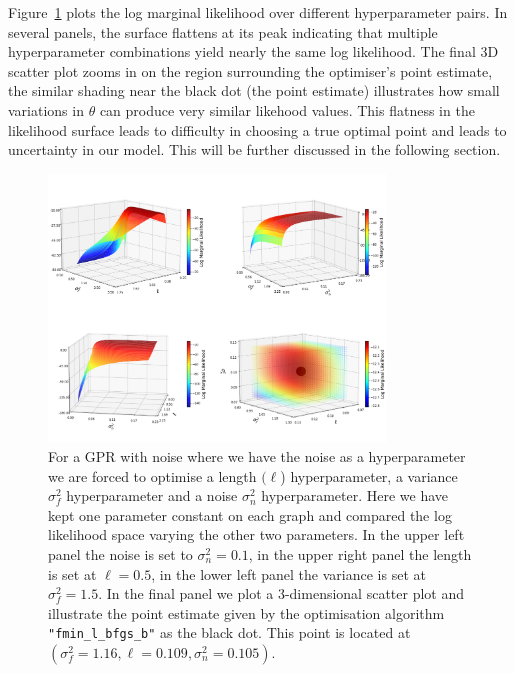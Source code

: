 \documentclass{ucdgradtaughtthesis}
\begin{document}
Figure~\ref{fig:Optimising_Hyperparams} plots the log marginal likelihood over different hyperparameter pairs. In several panels, the surface flattens at its peak indicating that multiple 
hyperparameter combinations yield nearly the same log likelihood.
The final 3D scatter plot zooms in on the region surrounding the optimiser's point estimate,
the similar shading near the black dot (the point estimate) illustrates how small variations in \(\theta\) can produce very similar likehood values. 
This flatness in the likelihood surface leads to difficulty in choosing a true optimal point and leads to uncertainty in our model. 
This will be further discussed in the following section.

\begin{figure}[H]
    \centering
    \includegraphics[width=0.8\textwidth]{LatexPlots/1dplots/LogLikeallparams.png}
    \caption[Visualising the log likelihood optimisation surfaces over the model parameters.]{For a GPR with noise where we have the noise as a hyperparameter we are forced to optimise a length \((\ell\)) hyperparameter, a variance \(\sigma_f^2\) hyperparameter and a noise \(\sigma_n^2\) hyperparameter. 
    Here we have kept one parameter constant on each graph and compared the log likelihood space varying the other two parameters. 
    In the upper left panel the noise is set to $\sigma^2_n= 0.1$, in the upper right panel the length is set at $ \ell=0.5$, in the lower left panel the variance is set at $\sigma^2_f=1.5$. 
    In the final panel we plot a 3-dimensional scatter plot and illustrate the point estimate given by the optimisation algorithm \texttt{"fmin\_l\_bfgs\_b"} as the black dot. This point is located at
    $(\sigma_f^2 = 1.16, \ell = 0.109, \sigma_n^2 = 0.105)$.}
   \label{fig:Optimising_Hyperparams}
\end{figure} 
\end{document}
